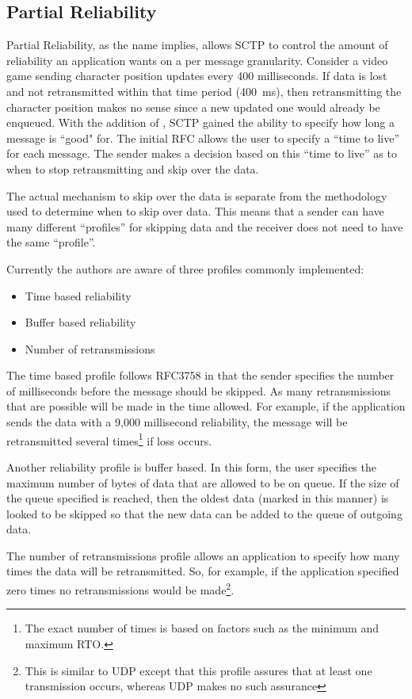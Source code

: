 \documentclass[conference]{IEEEtran}
\begin{document}
\subsection{Partial Reliability}
\label{prsctp}
Partial Reliability, as the name implies, allows SCTP to control the 
amount of reliability an application wants on a per message granularity.
Consider a video game sending character position updates every 400 milliseconds.
If data is lost and not retransmitted within that time period (400~ms), then
retransmitting the character position makes no sense since a new
updated one would already be enqueued. With the addition of \cite{rfc3758}, SCTP
gained the ability to specify how long a message is ``good" for.  The initial
RFC allows the user to specify a ``time to live'' for each message. The 
sender makes a decision based on this ``time to live'' as to when to stop retransmitting and
skip over the data. 

The actual mechanism to skip over the data is separate from the
methodology used to determine when to skip over data. This means that
a sender can have many different ``profiles'' for skipping data and the
receiver does not need to have the same ``profile''.

Currently the authors are aware of three profiles commonly implemented:
\begin{itemize}
  \item Time based reliability
  \item Buffer based reliability
  \item Number of retransmissions
\end{itemize}
The time based profile follows RFC3758 in that the sender specifies
the number of milliseconds before the message should be skipped.  As
many retransmissions that are possible will be made in the time allowed.
For example, if the application sends the data with a 9,000 millisecond
reliability, the message will be retransmitted several times\footnote{The exact
number of times is based on factors such as the minimum and maximum RTO.} if loss occurs.

Another reliability profile is buffer based. In this form, the user specifies the maximum
number of bytes of data that are allowed to be on queue. If the size of the queue 
specified is reached, then the oldest data (marked in this manner) is looked to be
skipped so that the new data can be added to the queue of outgoing data.

The number of retransmissions profile allows an application to specify how many
times the data will be retransmitted. So, for example, if the application specified
zero times no retransmissions would be made\footnote{This is similar to UDP
except that this profile assures that at least one transmission occurs, whereas
UDP makes no such assurance}.
\end{document}
